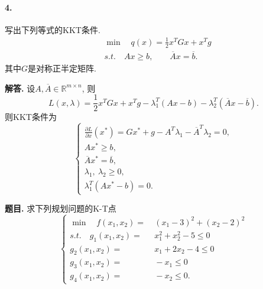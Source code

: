 \documentclass[12pt, a4paper, oneside]{ctexart}
\newenvironment{problem}{\par\noindent\textbf{题目. }}{\bigskip\par}
\newenvironment{solution}{\par\noindent\textbf{解答. }}{\bigskip\par}
\let\leq=\leqslant %
\let\geq=\geqslant %
\def\R{\mathbb{R}}      %
\def\ol{\overline}      %
\begin{document}
\paragraph{4.}写出下列等式的KKT条件.
\begin{equation*}
    \begin{aligned}
        &\ \min\quad q(x)=\frac{1}{2}x^TGx+x^Tg\\
        &\ s.t.\quad Ax\geq b,\qquad \ol{A}x=\ol{b}.
    \end{aligned}
\end{equation*}
其中$G$是对称正半定矩阵.
\begin{solution}
    设$A, \ol{A} \in \R^{m\times n}$, 则
    \begin{equation*}
        L(x,\lambda) = \frac{1}{2}x^TGx+x^Tg-\lambda_1^T(Ax-b)-\lambda_2^T(\ol{A}x-\ol{b}).
    \end{equation*}
    则KKT条件为
    \begin{equation*}
        \begin{cases}
            \frac{\partial L}{\partial x}(x^*) = Gx^*+g-A^T\lambda_1-\ol{A}^T\lambda_2 = 0,\\
            Ax^* \geq b,\\
            \ol{A}x^* = \ol{b},\\
            \lambda_1,\ \lambda_2\geq 0,\\
            \lambda_1^T(Ax^*-b) = 0.
        \end{cases}
    \end{equation*}
\end{solution}
\begin{problem}
    求下列规划问题的K-T点
    \begin{equation*}
        \left\{
            \begin{aligned}
                \min\quad f(x_1,x_2)=&\ (x_1-3)^2+(x_2-2)^2\\
                s.t.\quad g_1(x_1,x_2)=&\ x_1^2+x_2^2-5\leq 0\\
                g_2(x_1,x_2)=&\ x_1+2x_2-4\leq 0\\
                g_3(x_1,x_2)=&\ -x_1\leq 0\\
                g_4(x_1,x_2)=&\ -x_2\leq 0.
            \end{aligned}
        \right.
    \end{equation*}
\end{problem}
\end{document}
